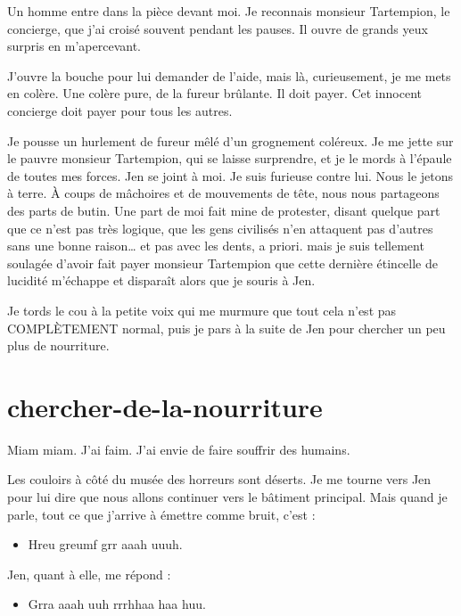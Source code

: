 Un homme entre dans la pièce devant moi. Je reconnais monsieur Tartempion, le concierge, que j'ai croisé souvent pendant les pauses. Il ouvre de grands yeux surpris en m'apercevant.

J'ouvre la bouche pour lui demander de l'aide, mais là, curieusement, je me mets en colère. Une colère pure, de la fureur brûlante. Il doit payer. Cet innocent concierge doit payer pour tous les autres.

Je pousse un hurlement de fureur mêlé d'un grognement coléreux. Je me jette sur le pauvre monsieur Tartempion, qui se laisse surprendre, et je le mords à l'épaule de toutes mes forces. Jen se joint à moi. Je suis furieuse contre lui. Nous le jetons à terre. À coups de mâchoires et de mouvements de tête, nous nous partageons des parts de butin. Une part de moi fait mine de protester, disant quelque part que ce n'est pas très logique, que les gens civilisés n'en attaquent pas d'autres sans une bonne raison… et pas avec les dents, a priori. mais je suis tellement soulagée d'avoir fait payer monsieur Tartempion que cette dernière étincelle de lucidité m'échappe et disparaît alors que je souris à Jen.

Je tords le cou à la petite voix qui me murmure que tout cela n'est pas COMPLÈTEMENT normal, puis je pars à la suite de Jen pour chercher un peu plus de nourriture.


\section{chercher-de-la-nourriture}

Miam miam. J'ai faim. J'ai envie de faire souffrir des humains.

Les couloirs à côté du musée des horreurs sont déserts. Je me tourne vers Jen pour lui dire que nous allons continuer vers le bâtiment principal. Mais quand je parle, tout ce que j'arrive à émettre comme bruit, c'est :

\begin{itemize}
\item Hreu greumf grr aaah uuuh.
\end{itemize}

Jen, quant à elle, me répond :

\begin{itemize}
\item Grra aaah uuh rrrhhaa haa huu.
\end{itemize}

